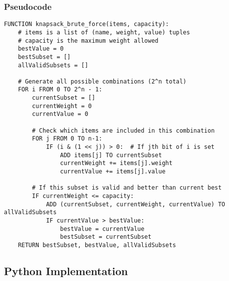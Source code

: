 \documentclass{article}
\begin{document}
\subsubsection*{Pseudocode}
\begin{lstlisting}
FUNCTION knapsack_brute_force(items, capacity):
    # items is a list of (name, weight, value) tuples
    # capacity is the maximum weight allowed
    bestValue = 0
    bestSubset = []
    allValidSubsets = []

    # Generate all possible combinations (2^n total)
    FOR i FROM 0 TO 2^n - 1:
        currentSubset = []
        currentWeight = 0
        currentValue = 0

        # Check which items are included in this combination
        FOR j FROM 0 TO n-1:
            IF (i & (1 << j)) > 0:  # If jth bit of i is set
                ADD items[j] TO currentSubset
                currentWeight += items[j].weight
                currentValue += items[j].value

        # If this subset is valid and better than current best
        IF currentWeight <= capacity:
            ADD (currentSubset, currentWeight, currentValue) TO allValidSubsets
            IF currentValue > bestValue:
                bestValue = currentValue
                bestSubset = currentSubset
    RETURN bestSubset, bestValue, allValidSubsets

\end{lstlisting}

\subsection*{Python Implementation}
\end{document}
